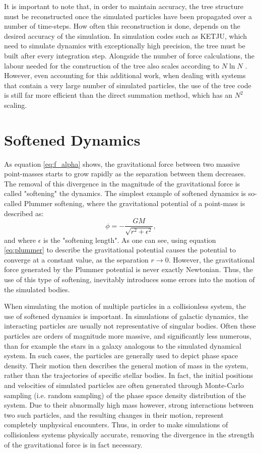 \documentclass[english, twoside]{HYgradu}
\begin{document}
It is important to note that, in order to maintain accuracy, the tree structure must be reconstructed once the simulated particles have been propagated over a number of time-steps. How often this reconstruction is done, depends on the desired accuracy of the simulation. In simulation codes such as KETJU, which need to simulate dynamics with exceptionally high precision, the tree must be built after every integration step. Alongside the number of force calculations, the labour needed for the construction of the tree also scales according to $N \ln N$ \citep{BinneyTremaine}. However, even accounting for this additional work, when dealing with systems that contain a very large number of simulated particles, the use of the tree code is still far more efficient than the direct summation method, which has an $N^2$ scaling.

\section{Softened Dynamics} \label{section:softened_dynamics}

As equation \ref{eq:f_alpha} shows, the gravitational force between two massive point-masses starts to grow rapidly as the separation between them decreases. The removal of this divergence in the magnitude of the gravitational force is called "softening" the dynamics. The simplest example of softened dynamics is so-called Plummer softening, where the gravitational potential of a point-mass is described as:
\begin{equation}
\phi = -\frac{GM}{\sqrt{r^2 + \epsilon^2}}, \label{eq:plummer}
\end{equation}
and where $\epsilon$ is the "softening length". As one can see, using equation \ref{eq:plummer} to describe the gravitational potential causes the potential to converge at a constant value, as the separation $r \rightarrow 0$. However, the gravitational force generated by the Plummer potential is never exactly Newtonian. Thus, the use of this type of softening, inevitably introduces some errors into the motion of the simulated bodies.

When simulating the motion of multiple particles in a collisionless system, the use of softened dynamics is important. In simulations of galactic dynamics, the interacting particles are usually not representative of singular bodies. Often these particles are orders of magnitude more massive, and significantly less numerous, than for example the stars in a galaxy analogous to the simulated dynamical system. In such cases, the particles are generally used to depict phase space density. Their motion then describes the general motion of mass in the system, rather than the trajectories of specific stellar bodies. In fact, the initial positions and velocities of simulated particles are often generated through Monte-Carlo sampling (i.e. random sampling) of the phase space density distribution of the system. Due to their abnormally high mass however, strong interactions between two such particles, and the resulting changes in their motion, represent completely unphysical encounters. Thus, in order to make simulations of collisionless systems physically accurate, removing the divergence in the strength of the gravitational force is in fact necessary.
\end{document}
